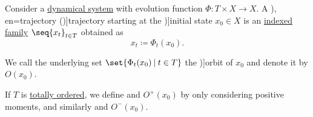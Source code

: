 \begin{definition}\label{def:dynamical_system_trajectory}\mimprovised
  Consider a \hyperref[def:dynamical_system]{dynamical system} with evolution function \( \Phi: T \times X \to X \). A \term[ru=траектория (\cite[35]{Юмагулов2015ДинамическиеСистемы}), en=trajectory (\cite[361]{Rozikov2012MultiDimensionalTimeDynamicalSystem})]{trajectory} starting at the \term[ru=начальное состояние (\cite[35]{Юмагулов2015ДинамическиеСистемы})]{initial state} \( x_0 \in X \) is an \hyperref[def:indexed_family]{indexed family} \( \seq{ x_t }_{t \in T} \) obtained as
  \begin{equation*}
    x_t \coloneqq \Phi_t(x_0).
  \end{equation*}

  We call the underlying set \( \set{ \Phi_t(x_0) \given t \in T } \) the \term[en=orbit (\cite[361]{Rozikov2012MultiDimensionalTimeDynamicalSystem})]{orbit} of \( x_0 \) and denote it by \( O(x_0) \).

  If \( T \) is \hyperref[def:totally_ordered_set]{totally ordered}, we define  and  \( O^+(x_0) \) by only considering positive moments, and similarly  and  \( O^-(x_0) \).
\end{definition}
